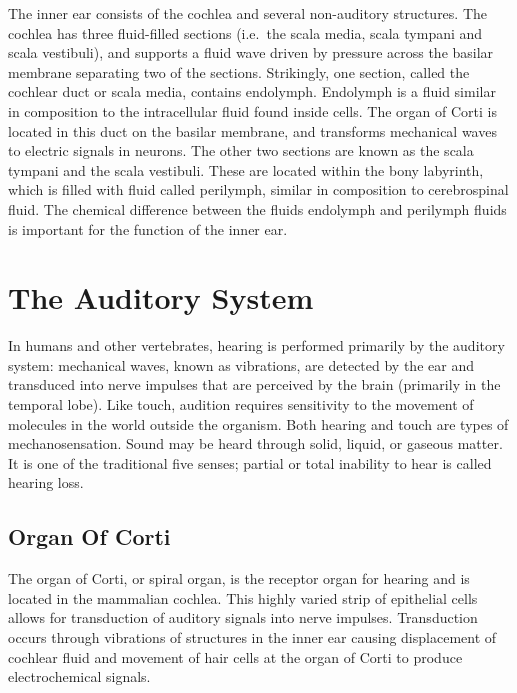 \documentclass[]{book}
\begin{document}
The inner ear consists of the cochlea and several non-auditory structures. The cochlea has three fluid-filled sections (i.e.~the scala media, scala tympani and scala vestibuli), and supports a fluid wave driven by pressure across the basilar membrane separating two of the sections. Strikingly, one section, called the cochlear duct or scala media, contains endolymph. Endolymph is a fluid similar in composition to the intracellular fluid found inside cells. The organ of Corti is located in this duct on the basilar membrane, and transforms mechanical waves to electric signals in neurons. The other two sections are known as the scala tympani and the scala vestibuli. These are located within the bony labyrinth, which is filled with fluid called perilymph, similar in composition to cerebrospinal fluid. The chemical difference between the fluids endolymph and perilymph fluids is important for the function of the inner ear.

\hypertarget{the-auditory-system}{%
\section{The Auditory System}\label{the-auditory-system}}

In humans and other vertebrates, hearing is performed primarily by the auditory system: mechanical waves, known as vibrations, are detected by the ear and transduced into nerve impulses that are perceived by the brain (primarily in the temporal lobe). Like touch, audition requires sensitivity to the movement of molecules in the world outside the organism. Both hearing and touch are types of mechanosensation. Sound may be heard through solid, liquid, or gaseous matter. It is one of the traditional five senses; partial or total inability to hear is called hearing loss.

\hypertarget{organ-of-corti}{%
\subsection{Organ Of Corti}\label{organ-of-corti}}

The organ of Corti, or spiral organ, is the receptor organ for hearing and is located in the mammalian cochlea. This highly varied strip of epithelial cells allows for transduction of auditory signals into nerve impulses. Transduction occurs through vibrations of structures in the inner ear causing displacement of cochlear fluid and movement of hair cells at the organ of Corti to produce electrochemical signals.
\end{document}
